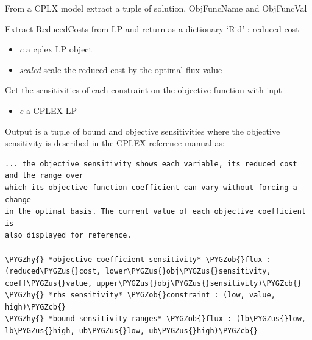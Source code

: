\documentclass[a4paper,11pt,english]{sphinxmanual}
\def\PYGZus{\char`\_}
\def\PYGZob{\char`\{}
\def\PYGZcb{\char`\}}
\def\PYGZhy{\char`\-}
\begin{document}

\begin{fulllineitems}
\label{modules_doc:cbmpy.CBCPLEX.cplx_getOptimalSolution2}
From a CPLX model extract a tuple of solution, ObjFuncName and ObjFuncVal

\end{fulllineitems}


\begin{fulllineitems}
\label{modules_doc:cbmpy.CBCPLEX.cplx_getReducedCosts}
Extract ReducedCosts from LP and return as a dictionary `Rid' : reduced cost
\begin{itemize}
\item {} 
\emph{c} a cplex LP object

\item {} 
\emph{scaled} scale the reduced cost by the optimal flux value

\end{itemize}

\end{fulllineitems}


\begin{fulllineitems}
\label{modules_doc:cbmpy.CBCPLEX.cplx_getSensitivities}
Get the sensitivities of each constraint on the objective function with inpt
\begin{itemize}
\item {} 
\emph{c} a CPLEX LP

\end{itemize}

Output is a tuple of bound and objective sensitivities where the objective
sensitivity is described in the CPLEX reference manual as:

\begin{Verbatim}[commandchars=\\\{\}]
... the objective sensitivity shows each variable, its reduced cost and the range over
which its objective function coefficient can vary without forcing a change
in the optimal basis. The current value of each objective coefficient is
also displayed for reference.

\PYGZhy{} *objective coefficient sensitivity* \PYGZob{}flux : (reduced\PYGZus{}cost, lower\PYGZus{}obj\PYGZus{}sensitivity, coeff\PYGZus{}value, upper\PYGZus{}obj\PYGZus{}sensitivity)\PYGZcb{}
\PYGZhy{} *rhs sensitivity* \PYGZob{}constraint : (low, value, high)\PYGZcb{}
\PYGZhy{} *bound sensitivity ranges* \PYGZob{}flux : (lb\PYGZus{}low, lb\PYGZus{}high, ub\PYGZus{}low, ub\PYGZus{}high)\PYGZcb{}
\end{Verbatim}

\end{fulllineitems}
\end{document}
